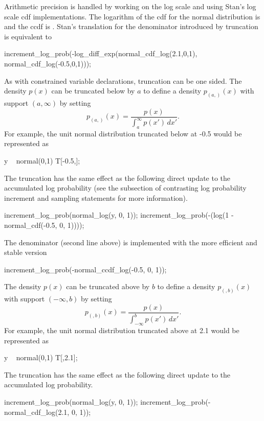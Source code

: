 Arithmetic precision is handled by working on the log scale and using
Stan's log scale cdf implementations.  The logarithm of the cdf for
the normal distribution is  and the ccdf is
.  Stan's translation for the denominator
introduced by truncation is equivalent to
%
\begin{stancode}
increment_log_prob(-log_diff_exp(normal_cdf_log(2.1,0,1),
                                 normal_cdf_log(-0.5,0,1)));
\end{stancode}
%

As with constrained variable declarations, truncation can be one
sided.  The density $p(x)$ can be truncated below by $a$ to define a
density $p_{(a,)}(x)$ with support $(a,\infty)$ by setting
%
\[
p_{(a,)}(x) = \frac{p(x)}
                 {\int_a^{\infty} p(x') \, dx'}.
\]
For example, the unit normal distribution truncated below at -0.5 would
be represented as
%
\begin{stancode}
y ~ normal(0,1) T[-0.5,];
\end{stancode}
%
The truncation has the same effect as the following direct update to
the accumulated log probability (see the subsection of
 contrasting log probability increment
and sampling statements for more information).
%
\begin{stancode}
increment_log_prob(normal_log(y, 0, 1));
increment_log_prob(-(log(1 - normal_cdf(-0.5, 0, 1))));
\end{stancode}
%
The denominator (second line above) is implemented with the more
efficient and stable version
%
\begin{stancode}
increment_log_prob(-normal_ccdf_log(-0.5, 0, 1));
\end{stancode}

The density $p(x)$ can be truncated above by $b$ to define a density
$p_{(,b)}(x)$ with support $(-\infty,b)$ by setting
\[
p_{(,b)}(x) = \frac{p(x)}
                    {\int_{-\infty}^b p(x') \, dx'}.
\]
For example, the unit normal distribution truncated above at 2.1 would
be represented as
%
\begin{stancode}
y ~ normal(0,1) T[,2.1];
\end{stancode}
%
The truncation has the same effect as the following direct update to
the accumulated log probability.
%
\begin{stancode}
increment_log_prob(normal_log(y, 0, 1));
increment_log_prob(-normal_cdf_log(2.1, 0, 1));
\end{stancode}

